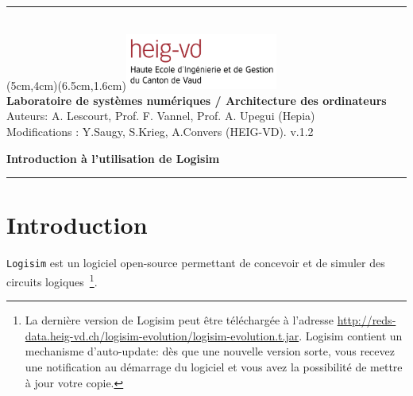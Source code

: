\documentclass[nosolution]{exercice}
\begin{document}
\noindent
\begin{minipage}[l]{\linewidth}
  \rule{\linewidth}{0.2mm} \\

  {\vspace{-5mm}
    \parpic(5cm,4cm)(6.5cm,1.6cm){\includegraphics[width=5cm]{images/HEIG-VD_logo_couleur_format_JPG.jpg}}
    \vspace{15mm} \\
    \textbf{Laboratoire de systèmes numériques / Architecture des ordinateurs} \\
    Auteurs: A. Lescourt, Prof. F. Vannel, Prof. A. Upegui (Hepia)\\
    Modifications : Y.Saugy, S.Krieg, A.Convers (HEIG-VD). v.1.2
    }

    \vspace{7mm}

  \begin{center}
    {\Large\textbf{Introduction à l'utilisation de Logisim} \\
      \vspace{5mm}}
  \end{center}

  \rule{\linewidth}{0.2mm}
\end{minipage}


\setlength{\parskip}{5pt}
\setlength{\parsep}{5pt}
\setlength{\topsep}{5pt}
\setlength{\itemsep}{5pt}

\renewcommand{\labelitemi}{$\bullet$}
\renewcommand{\labelitemii}{$-$}
\renewcommand{\labelitemiii}{$\diamond$}
\renewcommand{\labelitemiv}{$\ast$}


\section{Introduction}
\texttt{Logisim} est un logiciel open-source permettant de concevoir et de simuler des circuits
logiques~\footnote{La dernière version de Logisim peut être téléchargée à l'adresse
  \url{http://reds-data.heig-vd.ch/logisim-evolution/logisim-evolution.t.jar}.
  Logisim contient un mechanisme d'auto-update: dès que une nouvelle version sorte, vous recevez
  une notification au démarrage du logiciel et vous avez
  la possibilité de mettre à jour votre copie.}.
\end{document}

